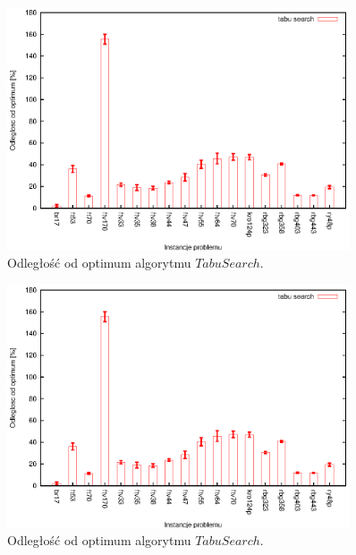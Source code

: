 \begin{figure}
\begin{center}
\includegraphics[width=0.9\textwidth]{wykresy/tabu_quality}
\end{center}
\caption{Odległość od optimum algorytmu $Tabu Search$.}
\label{tabu_quality}
\end{figure}

\begin{figure}
\begin{center}
\includegraphics[width=0.9\textwidth]{wykresy/tabu_quality}
\end{center}
\caption{Odległość od optimum algorytmu $Tabu Search$.}
\label{tabu_timeaaaaa}
\end{figure}

